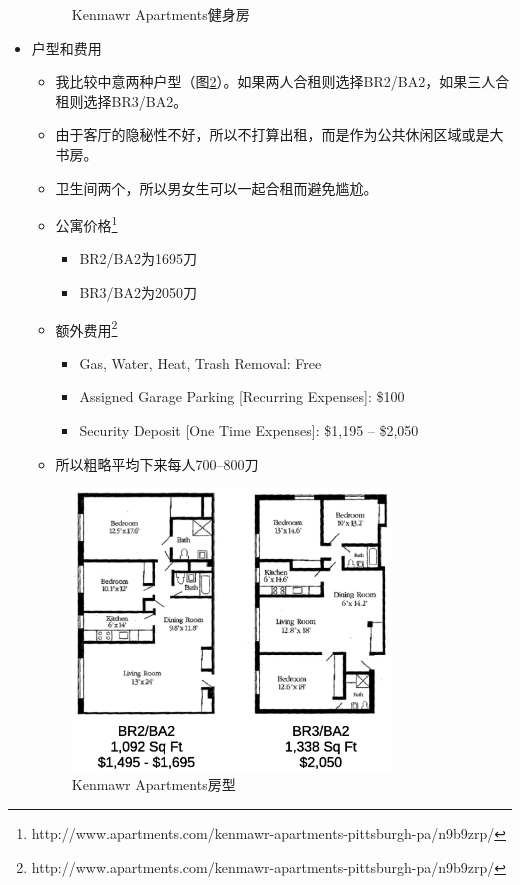 \documentclass[nofonts,a4paper,11pt]{article}
\begin{document}
\begin{itemize}
\begin{figure}[!htb]
		\caption{Kenmawr Apartments健身房}
		\label{fig:fitness}
	\end{figure}
	\item 户型和费用
	\begin{itemize}
		\item 我比较中意两种户型（图\ref{fig:floorplan}）。如果两人合租则选择BR2/BA2，如果三人合租则选择BR3/BA2。
		\item 由于客厅的隐秘性不好，所以不打算出租，而是作为公共休闲区域或是大书房。
		\item 卫生间两个，所以男女生可以一起合租而避免尴尬。
		\item 公寓价格\footnote{http://www.apartments.com/kenmawr-apartments-pittsburgh-pa/n9b9zrp/}
		\begin{itemize}
			\item BR2/BA2为1695刀
			\item BR3/BA2为2050刀
		\end{itemize}
		\item 额外费用\footnote{http://www.apartments.com/kenmawr-apartments-pittsburgh-pa/n9b9zrp/}
		\begin{itemize}
			\item Gas, Water, Heat, Trash Removal: Free
			\item Assigned Garage Parking [Recurring Expenses]: \$100
			\item Security Deposit [One Time Expenses]: \$1,195 -- \$2,050
		\end{itemize}
		\item 所以粗略平均下来每人700--800刀
	\end{itemize}
	\begin{figure}[!htb]
		\centering
		\includegraphics[width=0.8\textwidth]{./img/floorplan}
		\caption{Kenmawr Apartments房型}
		\label{fig:floorplan}
	\end{figure}
\end{itemize}
\end{document}
